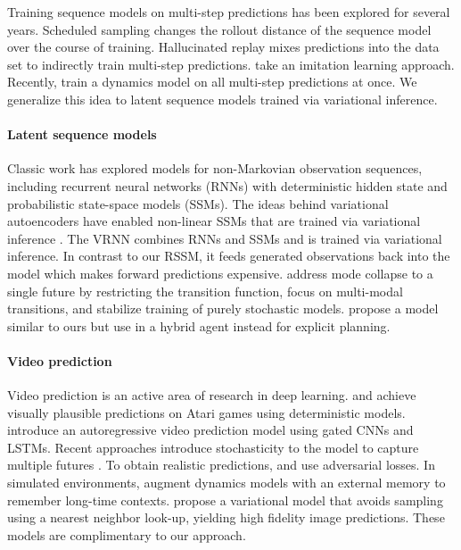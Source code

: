 Training sequence models on multi-step predictions has been explored for several years. Scheduled sampling \citep{bengio2015scheduled} changes the rollout distance of the sequence model over the course of training. Hallucinated replay \citep{talvitie2014hallucinated} mixes predictions into the data set to indirectly train multi-step predictions. \citet{venkatraman2015dad} take an imitation learning approach. Recently, \citet{amos2018awareness} train a dynamics model on all multi-step predictions at once. We generalize this idea to latent sequence models trained via variational inference.

\paragraph{Latent sequence models}

Classic work has explored models for non-Markovian observation sequences, including recurrent neural networks (RNNs) with deterministic hidden state and probabilistic state-space models (SSMs). The ideas behind variational autoencoders \citep{kingma2013vae,rezende2014vae} have enabled non-linear SSMs that are trained via variational inference \citep{krishnan2015deepkalman}. The VRNN \citep{chung2015vrnn} combines RNNs and SSMs and is trained via variational inference. In contrast to our RSSM, it feeds generated observations back into the model which makes forward predictions expensive. \citet{karl2016dvbf} address mode collapse to a single future by restricting the transition function, \citep{moerland2017learning} focus on multi-modal transitions, and \citet{doerr2018prssm} stabilize training of purely stochastic models. \citet{buesing2018dssm} propose a model similar to ours but use in a hybrid agent instead for explicit planning.

\paragraph{Video prediction}

Video prediction is an active area of research in deep learning. \citet{oh2015atari} and \citet{chiappa2017recurrent} achieve visually plausible predictions on Atari games using deterministic models. \citet{kalchbrenner2016vpn} introduce an autoregressive video prediction model using gated CNNs and LSTMs. Recent approaches introduce stochasticity to the model to capture multiple futures \citep{babaeizadeh2017sv2p,denton2018stochastic}. To obtain realistic predictions, \citet{mathieu2015deep} and \citet{vondrick2016generating} use adversarial losses. In simulated environments, \citet{gemici2017temporalmemory} augment dynamics models with an external memory to remember long-time contexts. \citet{van2017vq} propose a variational model that avoids sampling using a nearest neighbor look-up, yielding high fidelity image predictions. These models are complimentary to our approach.

